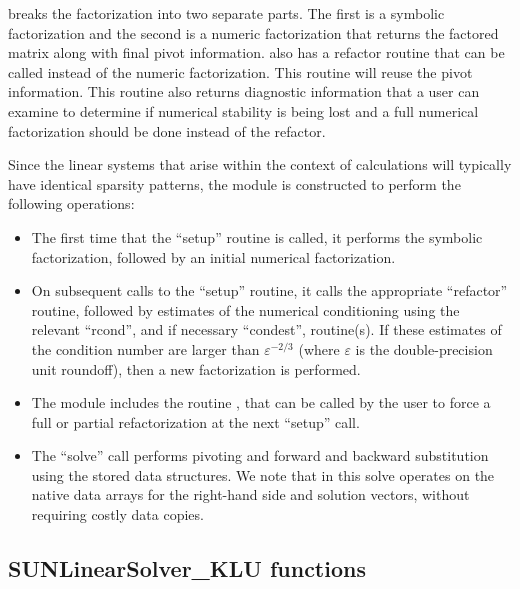 {\klu} breaks the factorization into two separate parts.  The first is
a symbolic factorization and the second is a numeric factorization
that returns the factored matrix along with final pivot information.   
{\klu} also has a refactor routine that can be called instead of the numeric 
factorization.  This routine will reuse the pivot information.  This routine 
also returns diagnostic information that a user can examine to determine if 
numerical stability is being lost and a full numerical factorization should 
be done instead of the refactor.

Since the linear systems that arise within the context of {\sundials}
calculations will typically have identical sparsity patterns, the
{\sunlinsolklu} module is constructed to perform the
following operations:
\begin{itemize}
\item The first time that the ``setup'' routine is called, it
  performs the symbolic factorization, followed by an initial
  numerical factorization.  
\item On subsequent calls to the ``setup'' routine, it calls the
  appropriate {\klu} ``refactor'' routine, followed by estimates of
  the numerical conditioning using the relevant ``rcond'', and if
  necessary ``condest'', routine(s).  If these estimates of the
  condition number are larger than $\varepsilon^{-2/3}$ (where
  $\varepsilon$ is the double-precision unit roundoff), then a new
  factorization is performed.
\item The module includes the routine , that 
  can be called by the user to force a full or partial refactorization
  at the next ``setup'' call. 
\item The ``solve'' call performs pivoting and forward and
  backward substitution using the stored {\klu} data structures.  We
  note that in this solve {\klu} operates on the native data arrays
  for the right-hand side and solution vectors, without requiring
  costly data copies.
\end{itemize}


\subsection{SUNLinearSolver\_KLU functions}
\label{ss:sunlinsol_klu_functions}

